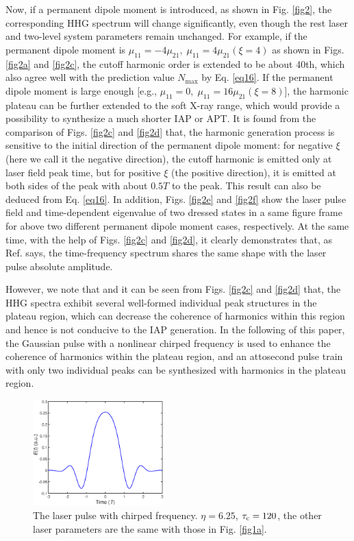 \documentclass[10pt,letterpaper]{article}
\begin{document}
Now, if a permanent dipole moment is introduced, as shown in Fig. \ref{fig2}, the corresponding HHG spectrum will change significantly, even though the rest laser and two-level system parameters remain unchanged. For example, if the permanent dipole moment is $\mu_{11} =-4\mu_{21},\;\mu_{11} =4\mu_{21}(\xi=4)$ as shown in Figs. \ref{fig2a} and \ref{fig2c}, the cutoff harmonic order is extended to be about 40th, which also agree well with the prediction value $N_\textrm{max}$ by Eq. \ref{eq16}. If the permanent dipole moment is large enough [e.g., $\mu_{11} =0,\;\mu_{11} =16\mu_{21}(\xi=8)$], the harmonic plateau can  be further extended to the soft X-ray range, which would provide a possibility to synthesize a much shorter IAP or APT. It is found from the comparison of Figs. \ref{fig2c} and \ref{fig2d} that, the harmonic generation process is sensitive to the initial direction of the permanent dipole moment: for negative $\xi$ (here we call it the negative direction), the cutoff harmonic is emitted only at laser field peak time, but for positive $\xi$ (the positive direction), it is emitted at both sides of the peak with about $0.5T$ to the peak. This result can also be deduced from Eq. \ref{eq16}. In addition, Figs. \ref{fig2e} and \ref{fig2f} show the laser pulse field and time-dependent eigenvalue of two dressed states in a same figure frame for above two different permanent dipole moment cases, respectively. At the same time, with the help of Figs. \ref{fig2c} and \ref{fig2d}, it clearly demonstrates that, as Ref. \cite{CuiNi2010NJP-wavelet} says, the time-frequency spectrum shares the same shape with the laser pulse absolute amplitude.    

However, we note that and it can be seen from Figs. \ref{fig2c} and \ref{fig2d} that, the HHG spectra exhibit several well-formed individual peak structures in the plateau region, which can decrease the coherence of harmonics within this region and hence is not conducive to the IAP generation. In the following of this paper, the Gaussian pulse with a nonlinear chirped frequency is used to enhance the coherence of harmonics within the plateau region, and an attosecond pulse train with only two individual peaks can be synthesized with harmonics in the plateau region.

\begin{figure}[!htbp]
	\centering
	\includegraphics[width=0.45\textwidth]{fig3}
	\caption{The laser pulse with chirped frequency. $ \eta=6.25 $, $ \tau_{\rm{c}}=120 $, the other laser parameters are the same with those in Fig. \ref{fig1a}.}
	\label{fig3}
\end{figure}
\end{document}
